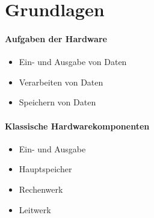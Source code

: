 \section{Grundlagen}

\paragraph{Aufgaben der Hardware}
\begin{itemize}
  \item Ein- und Ausgabe von Daten
  \item Verarbeiten von Daten
  \item Speichern von Daten
\end{itemize}

\paragraph{Klassische Hardwarekomponenten}
\begin{itemize}
  \item Ein- und Ausgabe
  \item Hauptspeicher
  \item Rechenwerk
  \item Leitwerk
\end{itemize}